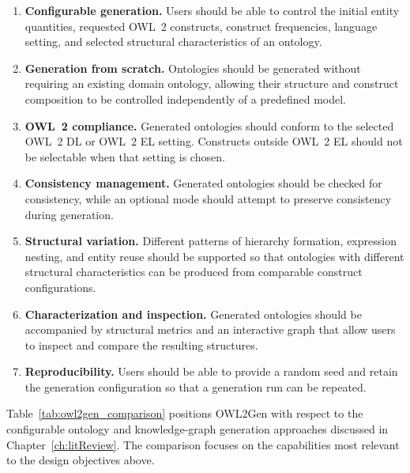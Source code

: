 \begin{enumerate}

\item \textbf{Configurable generation.}
Users should be able to control the initial entity quantities, requested
OWL~2 constructs, construct frequencies, language setting, and selected
structural characteristics of an ontology.

\item \textbf{Generation from scratch.}
Ontologies should be generated without requiring an existing domain
ontology, allowing their structure and construct composition to be
controlled independently of a predefined model.

\item \textbf{OWL~2 compliance.}
Generated ontologies should conform to the selected OWL~2 DL or OWL~2 EL
setting. Constructs outside OWL~2 EL should not be selectable when that
setting is chosen.

\item \textbf{Consistency management.}
Generated ontologies should be checked for consistency, while an optional
mode should attempt to preserve consistency during generation.

\item \textbf{Structural variation.}
Different patterns of hierarchy formation, expression nesting, and entity
reuse should be supported so that ontologies with different structural
characteristics can be produced from comparable construct configurations.

\item \textbf{Characterization and inspection.}
Generated ontologies should be accompanied by structural metrics and an
interactive graph that allow users to inspect and compare the resulting
structures.

\item \textbf{Reproducibility.}
Users should be able to provide a random seed and retain the generation
configuration so that a generation run can be repeated.

\end{enumerate}


\vspace{1em}
\noindent
Table~\ref{tab:owl2gen_comparison} positions OWL2Gen with respect to the
configurable ontology and knowledge-graph generation approaches discussed
in Chapter~\ref{ch:litReview}. The comparison focuses on the capabilities
most relevant to the design objectives above.

